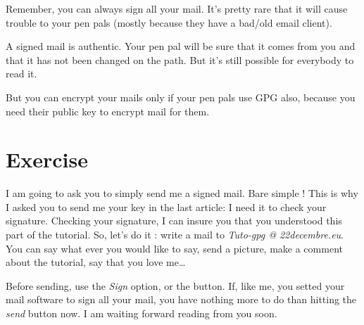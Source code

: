 Remember, you can always sign all your mail. It's pretty rare that it
will cause trouble to your pen pals (mostly because they have a bad/old
email client).

A signed mail is authentic. Your pen pal will be sure that it
comes from you and that it has not been changed on the path. But it's
still possible for everybody to read it.


But you can encrypt your mails only if your pen pals use GPG also,
because you need their public key to encrypt mail for them.

\section{Exercise}\label{exercise}

I am going to ask you to simply send me a signed mail. Bare
simple ! This is why I asked you to send me your key in the last article: I need
it to check your signature. Checking your signature, I can insure you
that you understood this part of the tutorial. So, let's do it : write a mail to \emph{Tuto-gpg @ 22decembre.eu}. You
can say what ever you would like to say, send a picture, make a comment
about the tutorial, say that you love me\ldots{}

Before sending, use the \emph{Sign} option, or the button. If, like me,
you setted your mail software to sign all your mail, you have nothing
more to do than hitting the \emph{send} button now. I am waiting forward reading from you soon.
